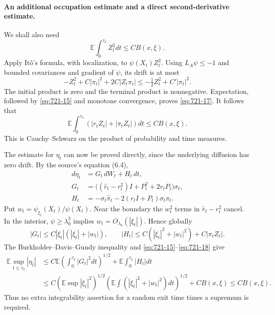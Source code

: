 \documentclass[11pt,a4paper]{article}
\theoremstyle{remark}
\begin{document}
\paragraph{An additional occupation estimate and a direct second-derivative estimate.}
We shall also need
\begin{equation}
 \mathbb E\int_0^{\tau_\delta}Z_t^2dt\le CB(x,\xi).
 \label{eq:721-17}
\end{equation}
Apply It\^o's formula, with localization, to $\psi(X_t)Z_t^2$.
Using $L_A\psi\le-1$ and bounded covariances and gradient of $\psi$, its
drift is at most
\[
 -Z_t^2+C|\pi_t|^2+2C|Z_t\pi_t|
 \le-\tfrac12Z_t^2+C'|\pi_t|^2.
\]
The initial product is zero and the terminal product is nonnegative.
Expectation, followed by \eqref{eq:721-15} and monotone convergence, proves \eqref{eq:721-17}.
It follows that
\begin{equation}
 \mathbb E\int_0^{\tau_\delta}
       (|r_tZ_t|+|\pi_tZ_t|)dt\le CB(x,\xi).
 \label{eq:721-18}
\end{equation}
This is Cauchy--Schwarz on the product of probability and time measures.

The estimate for $\eta_t$ can now be proved directly, since the underlying
diffusion has zero drift.  By the source's equation (6.4),
\[
 \begin{split}
 d\eta_t&=G_t\,dW_t+H_t\,dt,\\
 G_t&=\bigl((\widehat r_t-r_t^2)I+P_t^2+2r_tP_t\bigr)\sigma_t,\\
 H_t&=-\sigma_t\widehat\pi_t-2(r_tI+P_t)\sigma_t\pi_t.
 \end{split}
\]
Put $w_t=\psi_{\xi_t}(X_t)/\psi(X_t)$.  Near the boundary the $w_t^2$
terms in $\widehat r_t-r_t^2$ cancel.  In the interior, $\psi\ge\lambda_0^2$
implies $w_t=O_{\lambda_0}(|\xi_t|)$.  Hence globally
\[
 |G_t|\le C|\xi_t|(|\xi_t|+|w_t|),\qquad
 |H_t|\le C(|\xi_t|^2+|w_t|^2)+C|\pi_tZ_t|.
\]
The Burkholder--Davis--Gundy inequality and \eqref{eq:721-15}--\eqref{eq:721-18} give
\begin{equation}
 \begin{split}
 \mathbb E\sup_{t\le\tau_\delta}|\eta_t|
 &\le C\mathbb E\left(\int_0^{\tau_\delta}|G_t|^2dt\right)^{1/2}
       +\mathbb E\int_0^{\tau_\delta}|H_t|dt\\
 &\le C\left(\mathbb E\sup|\xi_t|^2\right)^{1/2}
        \left(\mathbb E\int(|\xi_t|^2+|w_t|^2)dt\right)^{1/2}
       +CB(x,\xi)
 \le CB(x,\xi).
 \end{split}
 \label{eq:721-19}
\end{equation}
Thus no extra integrability assertion for a random exit time times a
supremum is required.
\end{document}
